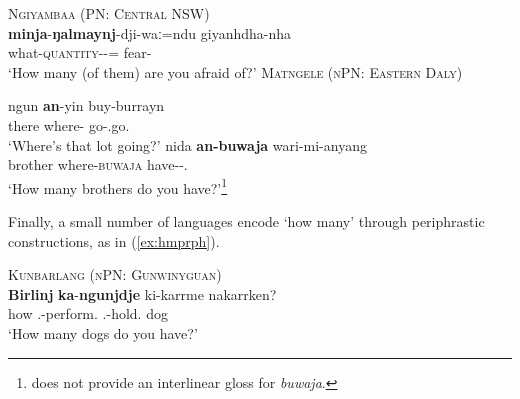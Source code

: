 \documentclass[12pt,egregdoesnotlikesansseriftitles]{scrartcl}
\begin{document}
 \begin{exe}
   \ex\label{ex:hmwhatq}\textsc{Ngiyambaa (PN: Central NSW)}\hfill {}\\
   \gll \textbf{minja}-\textbf{ŋalmaynj}-dji-waː=ndu giyanhdha-nha\\
   what-\textsc{quantity}-\Circ-\Excl=\Second\Nom{} fear-\Prs\\
   \glt `How many (of them) are you afraid of?'
   \ex \label{howmanyex2} \textsc{Matngele (nPN: Eastern Daly)}\hfill {}
   \begin{xlist}
     \ex \gll ngun \textbf{an}-yin buy-burrayn\\
     there where-\All{} go-\Third\Aug\Sbj.go.\Impv\\
     \glt `Where's that lot going?' %
     \ex \gll nida \textbf{an-buwaja} wari-mi-anyang\\
     brother where-\textsc{buwaja} have-\Impv-\Second\Min\Sbj.\Prs\\
     \glt `How many brothers do you have?'\footnote{\cite{zandvoort99} does not provide an interlinear gloss for \textit{buwaja}.} %
   \end{xlist}
 \end{exe}
  
 Finally, a small number of languages encode `how many'  through periphrastic constructions, as in (\ref{ex:hmprph}).
  
  \begin{exe}
  \ex\label{ex:hmprph}\textsc{Kunbarlang (nPN: Gunwinyguan)}\hfill \citep{ikthesis}\\
  \gll \textbf{Birlinj} \textbf{ka}-\textbf{ngunjdje} ki-karrme nakarrken?\\
  how \Tsg.\Nfut-perform.\Np{} \Ssg.\Nfut-hold.\Np{} dog\\
  \glt `How many dogs do you have?' %
\end{exe}
\end{document}
